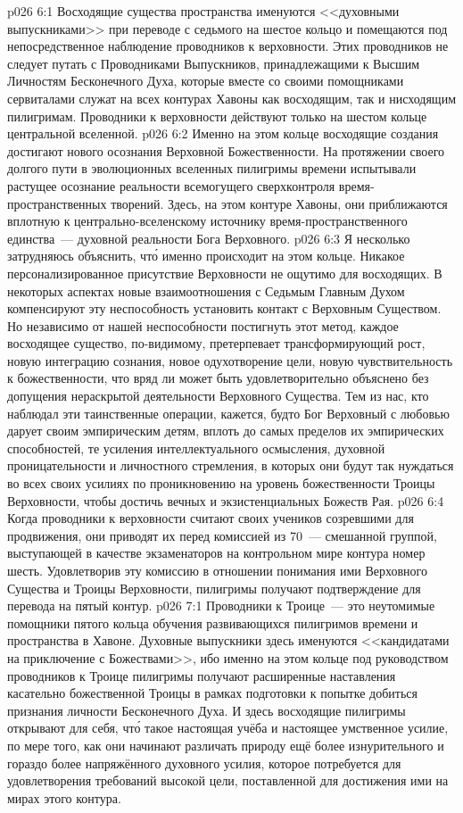\vs p026 6:1 Восходящие существа пространства именуются <<духовными выпускниками>> при переводе с седьмого на шестое кольцо и помещаются под непосредственное наблюдение проводников к верховности. Этих проводников не следует путать с Проводниками Выпускников, принадлежащими к Высшим Личностям Бесконечного Духа, которые вместе со своими помощниками сервиталами служат на всех контурах Хавоны как восходящим, так и нисходящим пилигримам. Проводники к верховности действуют только на шестом кольце центральной вселенной.
\vs p026 6:2 Именно на этом кольце восходящие создания достигают нового осознания Верховной Божественности. На протяжении своего долгого пути в эволюционных вселенных пилигримы времени испытывали растущее осознание реальности всемогущего сверхконтроля время\hyp{}пространственных творений. Здесь, на этом контуре Хавоны, они приближаются вплотную к центрально\hyp{}вселенскому источнику время\hyp{}пространственного единства~--- духовной реальности Бога Верховного.
\vs p026 6:3 Я несколько затрудняюсь объяснить, чт\'о именно происходит на этом кольце. Никакое персонализированное присутствие Верховности не ощутимо для восходящих. В некоторых аспектах новые взаимоотношения с Седьмым Главным Духом компенсируют эту неспособность установить контакт с Верховным Существом. Но независимо от нашей неспособности постигнуть этот метод, каждое восходящее существо, по\hyp{}видимому, претерпевает трансформирующий рост, новую интеграцию сознания, новое одухотворение цели, новую чувствительность к божественности, что вряд ли может быть удовлетворительно объяснено без допущения нераскрытой деятельности Верховного Существа. Тем из нас, кто наблюдал эти таинственные операции, кажется, будто Бог Верховный с любовью дарует своим эмпирическим детям, вплоть до самых пределов их эмпирических способностей, те усиления интеллектуального осмысления, духовной проницательности и личностного стремления, в которых они будут так нуждаться во всех своих усилиях по проникновению на уровень божественности Троицы Верховности, чтобы достичь вечных и экзистенциальных Божеств Рая.
\vs p026 6:4 Когда проводники к верховности считают своих учеников созревшими для продвижения, они приводят их перед комиссией из 70~--- смешанной группой, выступающей в качестве экзаменаторов на контрольном мире контура номер шесть. Удовлетворив эту комиссию в отношении понимания ими Верховного Существа и Троицы Верховности, пилигримы получают подтверждение для перевода на пятый контур.
\vs p026 7:1 Проводники к Троице~--- это неутомимые помощники пятого кольца обучения развивающихся пилигримов времени и пространства в Хавоне. Духовные выпускники здесь именуются <<кандидатами на приключение с Божествами>>, ибо именно на этом кольце под руководством проводников к Троице пилигримы получают расширенные наставления касательно божественной Троицы в рамках подготовки к попытке добиться признания личности Бесконечного Духа. И здесь восходящие пилигримы открывают для себя, чт\'о такое настоящая учёба и настоящее умственное усилие, по мере того, как они начинают различать природу ещё более изнурительного и гораздо более напряжённого духовного усилия, которое потребуется для удовлетворения требований высокой цели, поставленной для достижения ими на мирах этого контура.
